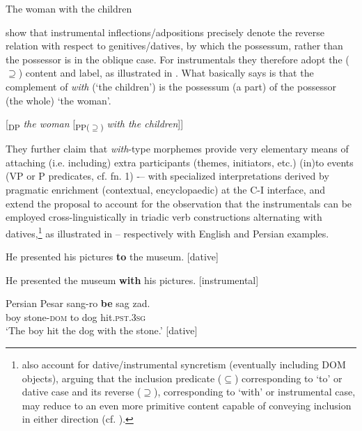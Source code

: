 \documentclass[output=paper,modfonts,nonflat,newtxmath,colorlinks,citecolor=brown]{langsci/langscibook}
\begin{document}
\ea%
    \label{ex:franco:4}
    The woman with the children
    \z        

\citet{FrancoManzini2017Ins} show that instrumental inflections/adpositions precisely denote the reverse relation with respect to genitives/datives, by which the possessum, rather than the possessor is in the oblique case. For instrumentals they therefore adopt the (${\supseteq}$) content and label, as illustrated in . What  basically says is that the complement of \textit{with} (‘the children’) is the possessum (a part) of the possessor (the whole) ‘the woman’.

\ea%
    \label{ex:franco:5}
     {[}\textsubscript{DP} \textit{the woman} [\textsubscript{PP(${\supseteq}$)} \textit{with the children}]{]}

    \z

          
They further claim that \textit{with}{}-type morphemes provide very elementary means of attaching (i.e. including) extra participants (themes, initiators, etc.) (in)to events (VP or \liv P predicates, cf. fn. 1) -– with specialized interpretations derived by pragmatic enrichment (contextual, encyclopaedic) at the C-I interface, and extend the proposal to account for the observation that the instrumentals can be employed cross-linguistically in triadic verb constructions alternating with datives,\footnote{\citet{FrancoManzini2017Ins} also account for dative/instrumental syncretism (eventually including DOM objects), arguing that the inclusion predicate (\textrm{${\subseteq}$}) corresponding to ‘to’ or dative case and its reverse (\textrm{${\supseteq}$}), corresponding to ‘with’ or instrumental case, may reduce to an even more primitive content capable of conveying inclusion in either direction (cf. ).}  as illustrated in -- respectively with English and Persian examples. 

\ea%
    \label{ex:franco:6}
    \ea \label{ex:franco:6a}
    He presented his pictures \textbf{to} the museum. \hfill[dative]
    
     \ex \label{ex:franco:6b}
    He presented the museum \textbf{with} his pictures. \hfill[instrumental]
    \z
    \z


\ea Persian%
    \label{ex:franco:7}
    \ea  \label{ex:franco:7a}
    \gll  Pesar sang-ro \textbf{be} sag zad.  \\
         boy stone-\textsc{dom} to dog hit.\textsc{pst.3sg} \\
    \glt ‘The boy hit the dog with the stone.’ \hfill [dative]
    
\end{document}
